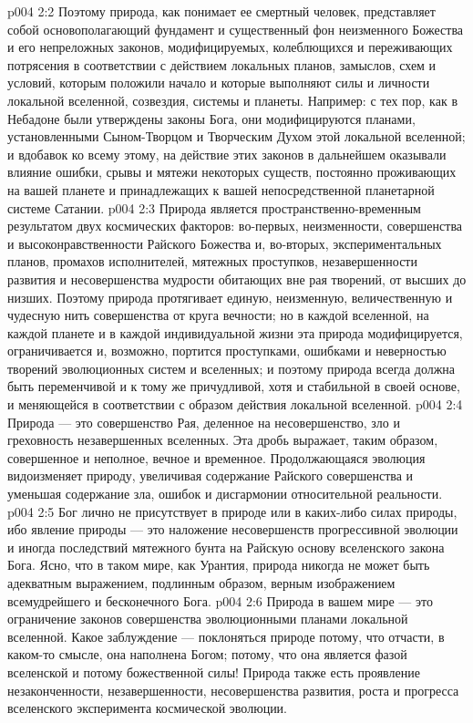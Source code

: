 \vs p004 2:2 Поэтому природа, как понимает ее смертный человек, представляет собой основополагающий фундамент и существенный фон неизменного Божества и его непреложных законов, модифицируемых, колеблющихся и переживающих потрясения в соответствии с действием локальных планов, замыслов, схем и условий, которым положили начало и которые выполняют силы и личности локальной вселенной, созвездия, системы и планеты. Например: с тех пор, как в Небадоне были утверждены законы Бога, они модифицируются планами, установленными Сыном\hyp{}Творцом и Творческим Духом этой локальной вселенной; и вдобавок ко всему этому, на действие этих законов в дальнейшем оказывали влияние ошибки, срывы и мятежи некоторых существ, постоянно проживающих на вашей планете и принадлежащих к вашей непосредственной планетарной системе Сатании.
\vs p004 2:3 \pc Природа является пространственно\hyp{}временным результатом двух космических факторов: во\hyp{}первых, неизменности, совершенства и высоконравственности Райского Божества и, во\hyp{}вторых, экспериментальных планов, промахов исполнителей, мятежных проступков, незавершенности развития и несовершенства мудрости обитающих вне рая творений, от высших до низших. Поэтому природа протягивает единую, неизменную, величественную и чудесную нить совершенства от круга вечности; но в каждой вселенной, на каждой планете и в каждой индивидуальной жизни эта природа модифицируется, ограничивается и, возможно, портится проступками, ошибками и неверностью творений эволюционных систем и вселенных; и поэтому природа всегда должна быть переменчивой и к тому же причудливой, хотя и стабильной в своей основе, и меняющейся в соответствии с образом действия локальной вселенной.
\vs p004 2:4 Природа --- это совершенство Рая, деленное на несовершенство, зло и греховность незавершенных вселенных. Эта дробь выражает, таким образом, совершенное и неполное, вечное и временное. Продолжающаяся эволюция видоизменяет природу, увеличивая содержание Райского совершенства и уменьшая содержание зла, ошибок и дисгармонии относительной реальности.
\vs p004 2:5 \pc Бог лично не присутствует в природе или в каких\hyp{}либо силах природы, ибо явление природы --- это наложение несовершенств прогрессивной эволюции и иногда последствий мятежного бунта на Райскую основу вселенского закона Бога. Ясно, что в таком мире, как Урантия, природа никогда не может быть адекватным выражением, подлинным образом, верным изображением всемудрейшего и бесконечного Бога.
\vs p004 2:6 Природа в вашем мире --- это ограничение законов совершенства эволюционными планами локальной вселенной. Какое заблуждение --- поклоняться природе потому, что отчасти, в каком\hyp{}то смысле, она наполнена Богом; потому, что она является фазой вселенской и потому божественной силы! Природа также есть проявление незаконченности, незавершенности, несовершенства развития, роста и прогресса вселенского эксперимента космической эволюции.
